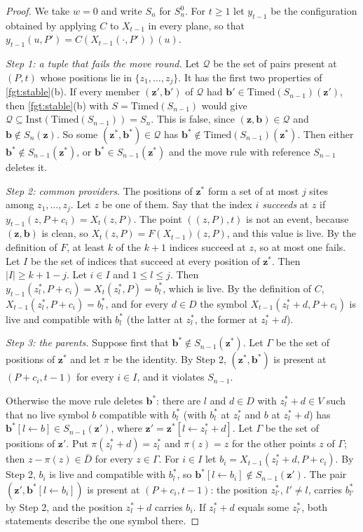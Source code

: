 \begin{proof}
We take $w=0$ and write $S_n$ for $S^0_n$. For $t\ge1$ let $y_{t-1}$ be the configuration obtained by applying $C$ to $X_{t-1}$ in every plane, so that $y_{t-1}(u,P')=C(X_{t-1}(\cdot,P'))(u)$.

\emph{Step 1: a tuple that fails the move round.} Let $\mathcal Q$ be the set of pairs present at $(P,t)$ whose positions lie in $\{z_1,\dots,z_j\}$. It has the first two properties of \cref{fgt:stable}(b). If every member $(\mathbf z',\mathbf b')$ of $\mathcal Q$ had $\mathbf b'\in\mathrm{Timed}(S_{n-1})(\mathbf z')$, then \cref{fgt:stable}(b) with $S=\mathrm{Timed}(S_{n-1})$ would give $\mathcal Q\subseteq\mathrm{Inst}(\mathrm{Timed}(S_{n-1}))=S_n$. This is false, since $(\mathbf z,\mathbf b)\in\mathcal Q$ and $\mathbf b\notin S_n(\mathbf z)$. So some $(\mathbf z^*,\mathbf b^*)\in\mathcal Q$ has $\mathbf b^*\notin\mathrm{Timed}(S_{n-1})(\mathbf z^*)$. Then either $\mathbf b^*\notin S_{n-1}(\mathbf z^*)$, or $\mathbf b^*\in S_{n-1}(\mathbf z^*)$ and the move rule with reference $S_{n-1}$ deletes it.

\emph{Step 2: common providers.} The positions of $\mathbf z^*$ form a set of at most $j$ sites among $z_1,\dots,z_j$. Let $z$ be one of them. Say that the index $i$ \emph{succeeds} at $z$ if $y_{t-1}(z,P+c_i)=X_t(z,P)$. The point $((z,P),t)$ is not an event, because $(\mathbf z,\mathbf b)$ is clean, so $X_t(z,P)=F(X_{t-1})(z,P)$, and this value is live. By the definition of $F$, at least $k$ of the $k+1$ indices succeed at $z$, so at most one fails. Let $I$ be the set of indices that succeed at every position of $\mathbf z^*$. Then $|I|\ge k+1-j$. Let $i\in I$ and $1\le l\le j$. Then $y_{t-1}(z^*_l,P+c_i)=X_t(z^*_l,P)=b^*_l$, which is live. By the definition of $C$, $X_{t-1}(z^*_l,P+c_i)=b^*_l$, and for every $d\in D$ the symbol $X_{t-1}(z^*_l+d,P+c_i)$ is live and compatible with $b^*_l$ (the latter at $z^*_l$, the former at $z^*_l+d$).

\emph{Step 3: the parents.} Suppose first that $\mathbf b^*\notin S_{n-1}(\mathbf z^*)$. Let $\Gamma$ be the set of positions of $\mathbf z^*$ and let $\pi$ be the identity. By Step 2, $(\mathbf z^*,\mathbf b^*)$ is present at $(P+c_i,t-1)$ for every $i\in I$, and it violates $S_{n-1}$.

Otherwise the move rule deletes $\mathbf b^*$: there are $l$ and $d\in D$ with $z^*_l+d\in V$ such that no live symbol $b$ compatible with $b^*_l$ (with $b^*_l$ at $z^*_l$ and $b$ at $z^*_l+d$) has $\mathbf b^*[l\leftarrow b]\in S_{n-1}(\mathbf z')$, where $\mathbf z'=\mathbf z^*[l\leftarrow z^*_l+d]$. Let $\Gamma$ be the set of positions of $\mathbf z'$. Put $\pi(z^*_l+d)=z^*_l$ and $\pi(z)=z$ for the other points $z$ of $\Gamma$; then $z-\pi(z)\in\bar D$ for every $z\in\Gamma$. For $i\in I$ let $b_i=X_{t-1}(z^*_l+d,P+c_i)$. By Step 2, $b_i$ is live and compatible with $b^*_l$, so $\mathbf b^*[l\leftarrow b_i]\notin S_{n-1}(\mathbf z')$. The pair $(\mathbf z',\mathbf b^*[l\leftarrow b_i])$ is present at $(P+c_i,t-1)$: the position $z^*_{l'}$, $l'\ne l$, carries $b^*_{l'}$ by Step 2, and the position $z^*_l+d$ carries $b_i$. If $z^*_l+d$ equals some $z^*_{l'}$, both statements describe the one symbol there.


\end{proof}
